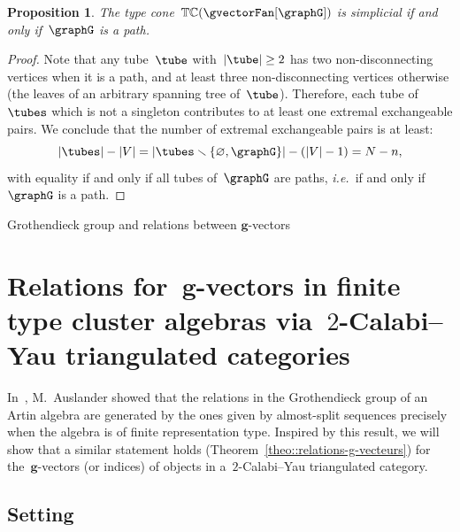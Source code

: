 \documentclass{amsart}
\makeatletter
\newtheorem{proposition}[theorem]{Proposition}
\theoremstyle{definition}
\renewcommand{\b}[1]{{\boldsymbol{#1}}} %
\newcommand{\ssm}{\smallsetminus} %
\newcommand{\ie}{\textit{i.e.}~} %
\newcommand{\typeCone}{\mathbb{TC}} %
\def\part{\@startsection{part}{1}%
\z@{.7\linespacing\@plus\linespacing}{.8\linespacing}%
{\LARGE\sffamily\centering}}
\makeatother
\begin{document}
\begin{proposition}
The type cone~$\typeCone(\gvectorFan[\graphG])$ is simplicial if and only if~$\graphG$ is a path.
\end{proposition}

\begin{proof}
Note that any tube~$\tube$ with~$|\tube| \ge 2$ has two non-disconnecting vertices when it is a path, and at least three non-disconnecting vertices otherwise (the leaves of an arbitrary spanning tree of~$\tube$).
Therefore, each tube of~$\tubes$ which is not a singleton contributes to at least one extremal exchangeable pairs.
We conclude that the number of extremal exchangeable pairs is at least:
\[
|\tubes| - |V| = |\tubes \ssm \{\varnothing, \graphG\}| - (|V|-1) = N - n,
\]
with equality if and only if all tubes of~$\graphG$ are paths, \ie if and only if~$\graphG$ is a path.
\end{proof}



\newpage
\part{Grothendieck group and relations between $\b{g}$-vectors}
\label{part:algebra}


\section{Relations for~$\b{g}$-vectors in finite type cluster algebras via~$2$-Calabi--Yau triangulated categories}
\label{sec:clusterCategories}

In~\cite{Auslander1984}, M.~Auslander showed that the relations in the Grothendieck group of an Artin algebra are generated by the ones given by almost-split sequences precisely when the algebra is of finite representation type.  Inspired by this result, we will show that a similar statement holds (Theorem~\ref{theo::relations-g-vecteurs}) for the~$\b g$-vectors (or indices) of objects in a~$2$-Calabi--Yau triangulated category. 

\subsection{Setting}
\label{sect::setting}
\end{document}
